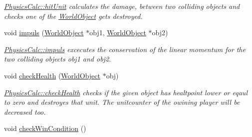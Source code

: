 \begin{DoxyCompactItemize}
\begin{DoxyCompactList}\small\item\em \hyperlink{class_physics_calc_a75c4cfbeb112120f4ffd4839182ca25c}{Physics\+Calc\+::hit\+Unit} calculates the damage, between two colliding objects and checks one of the \hyperlink{class_world_object}{World\+Object} gets destroyed. \end{DoxyCompactList}\item 
void \hyperlink{class_physics_calc_ad30acc4f9a1111e1d611aa943aff53a3}{impuls} (\hyperlink{class_world_object}{World\+Object} $\ast$obj1, \hyperlink{class_world_object}{World\+Object} $\ast$obj2)
\begin{DoxyCompactList}\small\item\em \hyperlink{class_physics_calc_ad30acc4f9a1111e1d611aa943aff53a3}{Physics\+Calc\+::impuls} excecutes the conservation of the linear momentum for the two colliding objects obj1 and obj2. \end{DoxyCompactList}\item 
void \hyperlink{class_physics_calc_aac58c297992ee6fd388ff29c839c5693}{check\+Health} (\hyperlink{class_world_object}{World\+Object} $\ast$obj)
\begin{DoxyCompactList}\small\item\em \hyperlink{class_physics_calc_aac58c297992ee6fd388ff29c839c5693}{Physics\+Calc\+::check\+Health} checks if the given object has healtpoint lower or eqaul to zero and destroyes that unit. The unitcounter of the owining player will be decreased too. \end{DoxyCompactList}\item 
void \hyperlink{class_physics_calc_a611a891e2f01de112884cc09f25d1e33}{check\+Win\+Condition} ()\hypertarget{class_physics_calc_a611a891e2f01de112884cc09f25d1e33}{}\label{class_physics_calc_a611a891e2f01de112884cc09f25d1e33}


\end{DoxyCompactItemize}
